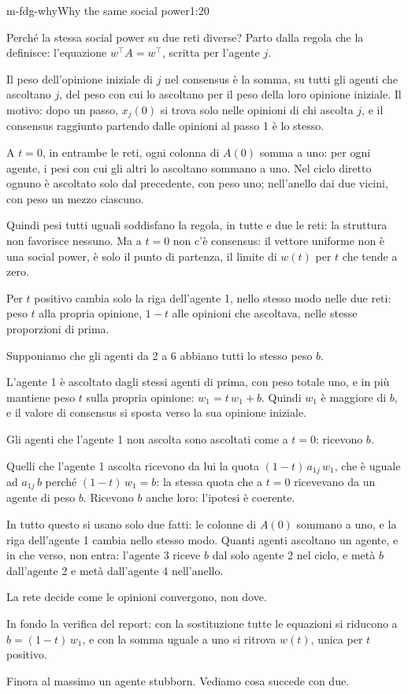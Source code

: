 \begin{slidedue}{m-fdg-why}{Why the same social power}{1:20}
  \begin{discorso}
    \item Perché la stessa social power su due reti diverse? Parto dalla regola che la definisce: l'equazione $w^\top A=w^\top$, scritta per l'agente $j$.
    \item Il peso dell'opinione iniziale di $j$ nel consensus è la somma, su tutti gli agenti che ascoltano $j$, del peso con cui lo ascoltano per il peso della loro opinione iniziale. Il motivo: dopo un passo, $x_j(0)$ si trova solo nelle opinioni di chi ascolta $j$, e il consensus raggiunto partendo dalle opinioni al passo 1 è lo stesso.
    \item A $t=0$, in entrambe le reti, ogni colonna di $A(0)$ somma a uno: per ogni agente, i pesi con cui gli altri lo ascoltano sommano a uno. Nel ciclo diretto ognuno è ascoltato solo dal precedente, con peso uno; nell'anello dai due vicini, con peso un mezzo ciascuno.
    \item Quindi pesi tutti uguali soddisfano la regola, in tutte e due le reti: la struttura non favorisce nessuno. Ma a $t=0$ non c'è consensus: il vettore uniforme non è una social power, è solo il punto di partenza, il limite di $w(t)$ per $t$ che tende a zero.
    \item Per $t$ positivo cambia solo la riga dell'agente 1, nello stesso modo nelle due reti: peso $t$ alla propria opinione, $1-t$ alle opinioni che ascoltava, nelle stesse proporzioni di prima.
    \item \clic Supponiamo che gli agenti da 2 a 6 abbiano tutti lo stesso peso $b$.
    \item L'agente 1 è ascoltato dagli stessi agenti di prima, con peso totale uno, e in più mantiene peso $t$ sulla propria opinione: $w_1=t\,w_1+b$. Quindi $w_1$ è maggiore di $b$, e il valore di consensus si sposta verso la sua opinione iniziale.
    \item Gli agenti che l'agente 1 non ascolta sono ascoltati come a $t=0$: ricevono $b$.
    \item Quelli che l'agente 1 ascolta ricevono da lui la quota $(1-t)\,a_{1j}\,w_1$, che è uguale ad $a_{1j}\,b$ perché $(1-t)\,w_1=b$: la stessa quota che a $t=0$ ricevevano da un agente di peso $b$. Ricevono $b$ anche loro: l'ipotesi è coerente.
    \item In tutto questo si usano solo due fatti: le colonne di $A(0)$ sommano a uno, e la riga dell'agente 1 cambia nello stesso modo. Quanti agenti ascoltano un agente, e in che verso, non entra: l'agente 3 riceve $b$ dal solo agente 2 nel ciclo, e metà $b$ dall'agente 2 e metà dall'agente 4 nell'anello.
    \item La rete decide come le opinioni convergono, non dove.
    \item In fondo la verifica del report: con la sostituzione tutte le equazioni si riducono a $b=(1-t)\,w_1$, e con la somma uguale a uno si ritrova $w(t)$, unica per $t$ positivo.
    \item Finora al massimo un agente stubborn. Vediamo cosa succede con due.
  \end{discorso}
\end{slidedue}

